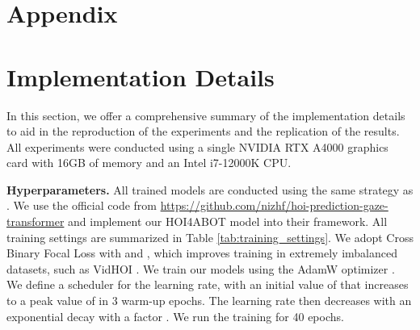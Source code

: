 \documentclass{article}
\begin{document}
\clearpage




  

\clearpage
\appendix
\section*{Appendix}
\renewcommand{\thesubsection}{\Alph{subsection}}

\section{Implementation Details} \label{apx:implementation}
In this section, we offer a comprehensive summary of the implementation details to aid in the reproduction of the experiments and the replication of the results. All experiments were conducted using a single NVIDIA RTX A4000 graphics card with 16GB of memory and an Intel i7-12000K CPU. 

\textbf{Hyperparameters.} All trained models are conducted using the same strategy as \citep{NI2023103741}. We use the official code from \href{https://github.com/nizhf/hoi-prediction-gaze-transformer}{https://github.com/nizhf/hoi-prediction-gaze-transformer} and implement our HOI4ABOT model into their framework. All training settings are summarized in Table \ref{tab:training_settings}. We adopt Cross Binary Focal Loss \citep{focalloss} with   and , which improves training in extremely imbalanced datasets, such as VidHOI \citep{Chiou2021}. We train our models using the AdamW optimizer \cite{adamw}. We define a scheduler for the learning rate, with an initial value of  that increases to a peak value of  in 3 warm-up epochs. The learning rate then decreases with an exponential decay with a factor . We run the training for 40 epochs.
\end{document}
